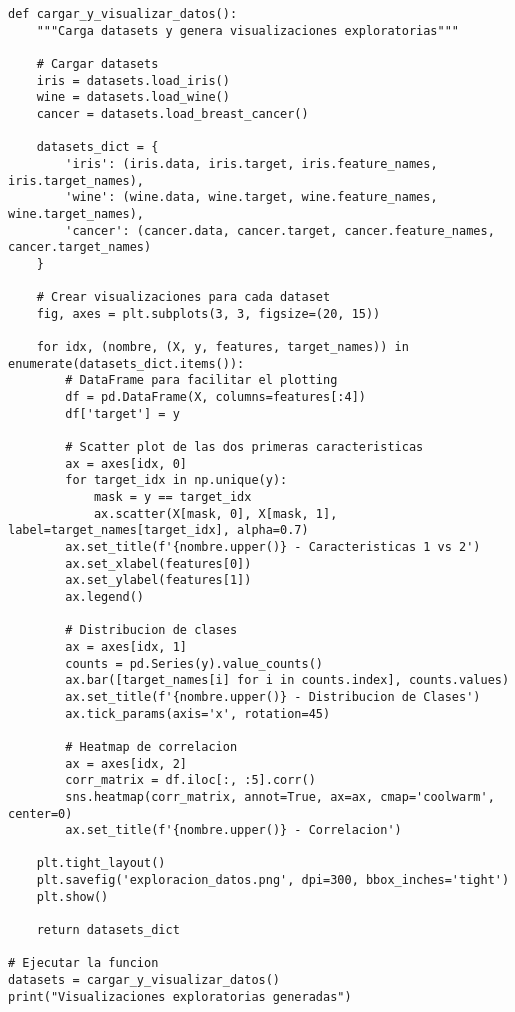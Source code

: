 \documentclass[12pt]{article}
\begin{document}
\begin{lstlisting}
def cargar_y_visualizar_datos():
    """Carga datasets y genera visualizaciones exploratorias"""
    
    # Cargar datasets
    iris = datasets.load_iris()
    wine = datasets.load_wine()
    cancer = datasets.load_breast_cancer()
    
    datasets_dict = {
        'iris': (iris.data, iris.target, iris.feature_names, iris.target_names),
        'wine': (wine.data, wine.target, wine.feature_names, wine.target_names),
        'cancer': (cancer.data, cancer.target, cancer.feature_names, cancer.target_names)
    }
    
    # Crear visualizaciones para cada dataset
    fig, axes = plt.subplots(3, 3, figsize=(20, 15))
    
    for idx, (nombre, (X, y, features, target_names)) in enumerate(datasets_dict.items()):
        # DataFrame para facilitar el plotting
        df = pd.DataFrame(X, columns=features[:4])
        df['target'] = y
        
        # Scatter plot de las dos primeras caracteristicas
        ax = axes[idx, 0]
        for target_idx in np.unique(y):
            mask = y == target_idx
            ax.scatter(X[mask, 0], X[mask, 1], label=target_names[target_idx], alpha=0.7)
        ax.set_title(f'{nombre.upper()} - Caracteristicas 1 vs 2')
        ax.set_xlabel(features[0])
        ax.set_ylabel(features[1])
        ax.legend()
        
        # Distribucion de clases
        ax = axes[idx, 1]
        counts = pd.Series(y).value_counts()
        ax.bar([target_names[i] for i in counts.index], counts.values)
        ax.set_title(f'{nombre.upper()} - Distribucion de Clases')
        ax.tick_params(axis='x', rotation=45)
        
        # Heatmap de correlacion
        ax = axes[idx, 2]
        corr_matrix = df.iloc[:, :5].corr()
        sns.heatmap(corr_matrix, annot=True, ax=ax, cmap='coolwarm', center=0)
        ax.set_title(f'{nombre.upper()} - Correlacion')
    
    plt.tight_layout()
    plt.savefig('exploracion_datos.png', dpi=300, bbox_inches='tight')
    plt.show()
    
    return datasets_dict

# Ejecutar la funcion
datasets = cargar_y_visualizar_datos()
print("Visualizaciones exploratorias generadas")
\end{lstlisting}
\end{document}
